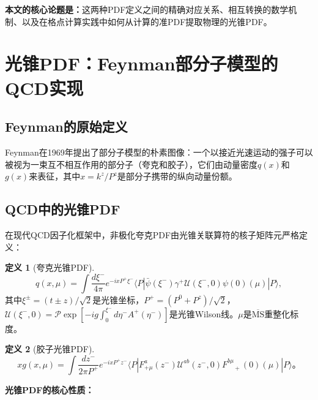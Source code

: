 \documentclass[12pt,a4paper]{ctexart}
\theoremstyle{definition}
\newtheorem{definition}{定义}[section]
\begin{document}
\textbf{本文的核心论题是：}这两种PDF定义之间的精确对应关系、相互转换的数学机制、以及在格点计算实践中如何从计算的准PDF提取物理的光锥PDF。

\section{光锥PDF：Feynman部分子模型的QCD实现}

\subsection{Feynman的原始定义}

Feynman在1969年提出了部分子模型的朴素图像\cite{Ji2014LaMET}：一个以接近光速运动的强子可以被视为一束互不相互作用的部分子（夸克和胶子），它们由动量密度$q(x)$和$g(x)$来表征，其中$x = k^z/P^z$是部分子携带的纵向动量份额。

\subsection{QCD中的光锥PDF}

在现代QCD因子化框架中，非极化夸克PDF由光锥关联算符的核子矩阵元严格定义\cite{Izubuchi2018}：

\begin{definition}[夸克光锥PDF]
\begin{equation}
\boxed{q(x, \mu) = \int \frac{d\xi^-}{4\pi} e^{-ixP^+\xi^-} \langle P| \bar{\psi}(\xi^-) \gamma^+ \mathcal{U}(\xi^-, 0) \psi(0)(\mu) |P\rangle},
\label{eq:LC_quark_pdf}
\end{equation}
其中$\xi^\pm = (t \pm z)/\sqrt{2}$是光锥坐标，$P^+ = (P^0 + P^z)/\sqrt{2}$，$\mathcal{U}(\xi^-,0) = \mathcal{P}\exp[-ig\int_0^{\xi^-} d\eta^- A^+(\eta^-)]$是光锥Wilson线。$\mu$是$\overline{\text{MS}}$重整化标度。
\end{definition}

\begin{definition}[胶子光锥PDF]\cite{Chen2025gluon}
\begin{equation}
\boxed{xg(x, \mu) = \int \frac{dz^-}{2\pi P^+} e^{-ixP^+z^-} \langle P| F^{a}_{+\mu}(z^-) \mathcal{U}^{ab}(z^-, 0) F^{b\mu}_{\phantom{b\mu}+}(0)(\mu) |P\rangle}。
\label{eq:LC_gluon_pdf}
\end{equation}
\end{definition}

\textbf{光锥PDF的核心性质：}
\end{document}
